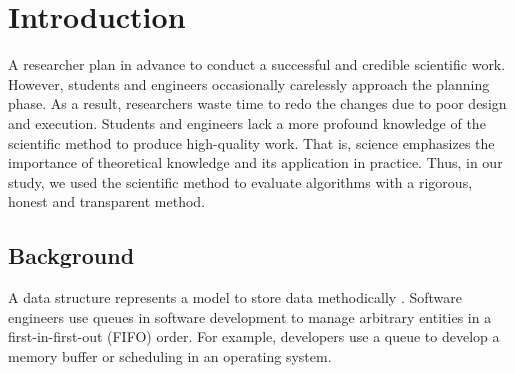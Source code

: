 \documentclass[a4paper,11pt]{kth-mag}
\begin{document}
{
    \hypersetup{linkcolor=black}
    \tableofcontents*
}
\mainmatter
\pagestyle{newchap}


\chapter{Introduction}\label{chapter:intro}
A researcher plan in advance to conduct a successful and credible scientific work.
However, students and engineers occasionally carelessly approach the planning phase.
As a result, researchers waste time to redo the changes due to poor design and execution.
Students and engineers lack a more profound knowledge of the scientific method to produce high-quality work.
That is, science emphasizes the importance of theoretical knowledge and its application in practice.
Thus, in our study, we used the scientific method to evaluate algorithms with a rigorous, honest and transparent method.

\section{Background}
A data structure represents a model to store data methodically \cite{deshpande2004c}.
Software engineers use queues in software development to manage arbitrary entities in a first-in-first-out (FIFO) order.
For example, developers use a queue to develop a memory buffer or scheduling in an operating system.
\end{document}
